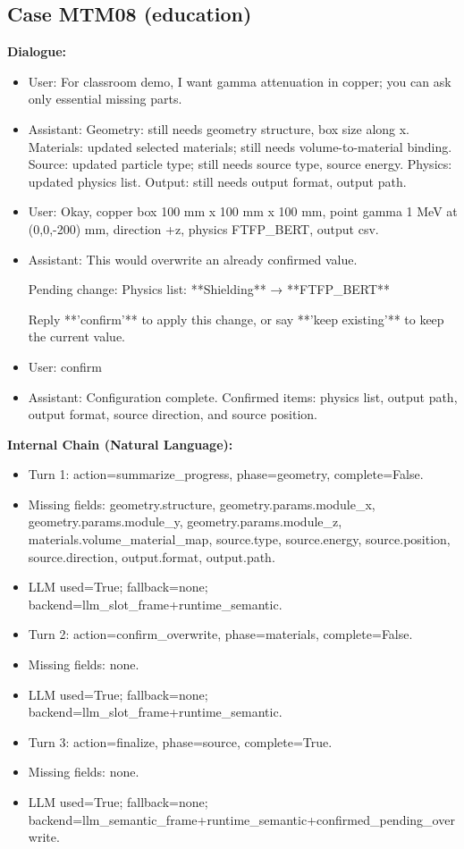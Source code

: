 \documentclass[11pt]{ctexart}
\begin{document}
\subsection{Case MTM08 (education)}
\textbf{Dialogue:}
\begin{itemize}
\item User: For classroom demo, I want gamma attenuation in copper; you can ask only essential missing parts.
\item Assistant: Geometry: still needs geometry structure, box size along x. Materials: updated selected materials; still needs volume-to-material binding. Source: updated particle type; still needs source type, source energy. Physics: updated physics list. Output: still needs output format, output path.
\item User: Okay, copper box 100 mm x 100 mm x 100 mm, point gamma 1 MeV at (0,0,-200) mm, direction +z, physics FTFP\_BERT, output csv.
\item Assistant: This would overwrite an already confirmed value.

Pending change:
Physics list: **Shielding** → **FTFP\_BERT**

Reply **'confirm'** to apply this change, or say **'keep existing'** to keep the current value.
\item User: confirm
\item Assistant: Configuration complete. Confirmed items: physics list, output path, output format, source direction, and source position.
\end{itemize}
\textbf{Internal Chain (Natural Language):}
\begin{itemize}
\item Turn 1: action=summarize\_progress, phase=geometry, complete=False.
\item Missing fields: geometry.structure, geometry.params.module\_x, geometry.params.module\_y, geometry.params.module\_z, materials.volume\_material\_map, source.type, source.energy, source.position, source.direction, output.format, output.path.
\item LLM used=True; fallback=none; backend=llm\_slot\_frame+runtime\_semantic.
\item Turn 2: action=confirm\_overwrite, phase=materials, complete=False.
\item Missing fields: none.
\item LLM used=True; fallback=none; backend=llm\_slot\_frame+runtime\_semantic.
\item Turn 3: action=finalize, phase=source, complete=True.
\item Missing fields: none.
\item LLM used=True; fallback=none; backend=llm\_semantic\_frame+runtime\_semantic+confirmed\_pending\_overwrite.
\end{itemize}
\end{document}
